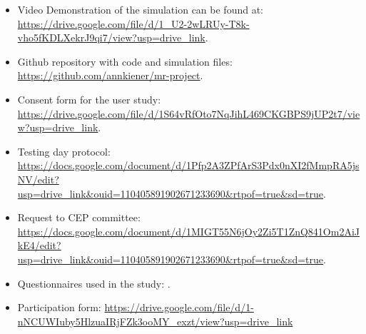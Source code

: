 \begin{itemize}

\item   Video Demonstration of the simulation can be found at: \url{https://drive.google.com/file/d/1_U2-2wLRUy-T8k-vho5fKDLXekrJ9qi7/view?usp=drive_link}.
\item Github repository with code and simulation files: \url{https://github.com/annkiener/mr-project}.
\item Consent form for the user study: \url{https://drive.google.com/file/d/1S64vRfOto7NqJihL469CKGBPS9jUP2t7/view?usp=drive_link}.
\item Testing day protocol: \url{https://docs.google.com/document/d/1Pfp2A3ZPfArS3Pdx0nXI2fMmpRA5jsNV/edit?usp=drive_link&ouid=110405891902671233690&rtpof=true&sd=true}.
\item Request to CEP committee: \url{https://docs.google.com/document/d/1MIGT55N6jOy2Zi5T1ZnQ841Om2AiJkE4/edit?usp=drive_link&ouid=110405891902671233690&rtpof=true&sd=true}.
\item Questionnaires used in the study: \url{}.
\item Participation form: \url{https://drive.google.com/file/d/1-nNCUWIuby5HlzuaIRjFZk3ooMY_exzt/view?usp=drive_link}

\end{itemize}